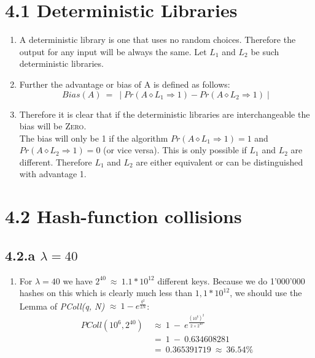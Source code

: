 \documentclass{report}
\begin{document}
	\pagestyle{fancy}
	
	\section*{4.1 Deterministic Libraries}
	\begin{enumerate}[]
		\item A deterministic library is one  that uses no random choices. Therefore the output for any input will be always the same. Let $L_1$ and $L_2$ be such deterministic libraries.
		\item Further the advantage or bias of A is defined as follows:
		\[
			Bias(A) \ = \ \mid Pr(A \diamond L_1 \Rightarrow 1) - Pr(A \diamond L_2 \Rightarrow 1) \mid
		\]
		\item Therefore it is clear that if the deterministic libraries are interchangeable the bias will be \textsc{Zero}. \\
		The bias will only be 1 if the algorithm $Pr(A \diamond L_1 \Rightarrow 1) = 1$ and $Pr(A \diamond L_2 \Rightarrow 1) = 0$ (or vice versa). This is only possible if $L_1$ and $L_2$ are different. Therefore $L_1$ and $L_2$ are either equivalent or can be distinguished with advantage 1.
	\end{enumerate}
	
	\section*{4.2 Hash-function collisions}
	\subsection*{4.2.a $\lambda = 40$}
	\begin{enumerate}[]
		\item For $\lambda = 40$ we have $2^{40} \ \approx \ 1.1 * 10^{12}$ different keys. Because we do 1'000'000 hashes on this which is clearly much less than $1,1 * 10^{12}$, we should use the Lemma of \textit{PColl(q, N)} $\approx \ 1 - e^{\frac{q^2}{2N}}$:
		\begin{align*}
			PColl(10^6, 2^{40}) \ & \approx \ 1 \ - \ e^{\frac{(10^6)^2}{2 \times 2^{40}}} \\
			& = \ 1 \ - \ 0.634608281 \\
			& = \ 0.365391719 \ \approx \ 36.54 \%
		\end{align*}
	\end{enumerate}
\end{document}
